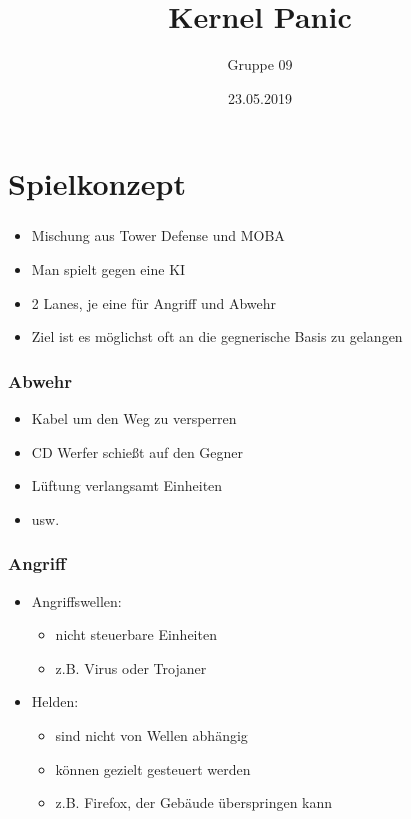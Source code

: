 \documentclass{beamer}
\title{Kernel Panic}
\author{Gruppe 09}
\date{23.05.2019}
\begin{document}
{
\frame{}
}

\section[Outline]{}
\frame{\tableofcontents}

\section{Spielkonzept}
\begin{frame}
\frametitle{\secname}
\begin{itemize}
\item Mischung aus Tower Defense und MOBA
\item Man spielt gegen eine KI
\item 2 Lanes, je eine für Angriff und Abwehr
\item Ziel ist es möglichst oft an die gegnerische Basis zu gelangen
\end{itemize}
\end{frame}

\begin{frame}
\frametitle{Abwehr}
\begin{itemize}
\item Kabel um den Weg zu versperren
\item CD Werfer schießt auf den Gegner
\item Lüftung verlangsamt Einheiten
\item usw.
\end{itemize}
\end{frame}

\begin{frame}
\frametitle{Angriff}
\begin{itemize}
\item Angriffswellen:
\begin{itemize}
\item nicht steuerbare Einheiten
\item z.B. Virus oder Trojaner
\end{itemize}
\item Helden:
\begin{itemize}
\item sind nicht von Wellen abhängig
\item können gezielt gesteuert werden
\item z.B. Firefox, der Gebäude überspringen kann
\end{itemize}
\end{itemize}
\end{frame}
\end{document}
